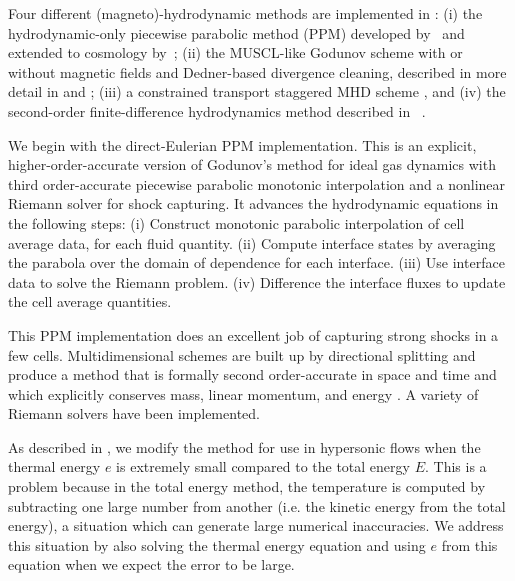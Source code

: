 Four different (magneto)-hydrodynamic methods are implemented in
\enzo: (i) the hydrodynamic-only piecewise parabolic method (PPM)
developed by~\citet{1984JCoPh..54..174C} and extended to cosmology
by~\citet{1995CoPhC..89..149B}; (ii) the MUSCL-like Godunov scheme
\citep{MUSCL} with or without magnetic fields and Dedner-based
divergence cleaning, described in more detail in
\citet{WangAbelZhang08} and \citet{WangAbel09}; (iii) a constrained
transport staggered MHD scheme \citep{Collins10}, and (iv) the
second-order finite-difference hydrodynamics method described in
\zeus~\citep{Stone92a,Stone92b}.

We begin with the direct-Eulerian PPM implementation.  This is an
explicit, higher-order-accurate version of Godunov's method for ideal
gas dynamics with third order-accurate piecewise parabolic monotonic
interpolation and a nonlinear Riemann solver for shock capturing.  It
advances the hydrodynamic equations in the following steps:
(i) Construct monotonic parabolic interpolation of cell average data,
for each fluid quantity.
(ii) Compute interface states by averaging the parabola over the
domain of dependence for each interface.
(iii) Use interface data to solve the Riemann problem.
(iv) Difference the interface fluxes to update the cell average
quantities.

This PPM implementation does an excellent job of capturing strong
shocks in a few cells.  Multidimensional schemes are built up by
directional splitting and produce a method that is formally second
order-accurate in space and time and which explicitly conserves mass,
linear momentum, and energy \citep{Hawley84, Norman86}.  A variety of
Riemann solvers have been implemented.

As described in \citet{Bryan95}, we modify the method for use in
hypersonic flows when the thermal energy $e$ is extremely small
compared to the total energy $E$.  This is a problem because in the
total energy method, the temperature is computed by subtracting one
large number from another (i.e. the kinetic energy from the total
energy), a situation which can generate large numerical inaccuracies.
We address this situation by also solving the thermal energy equation
and using $e$ from this equation when we expect the error to be large.

